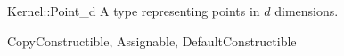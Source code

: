 \begin{ccRefConcept}{Kernel::Point_d}
A type representing points in $d$ dimensions.

\ccRefines
CopyConstructible, Assignable, DefaultConstructible

\ccSeeAlso
{} \\
 \\

\end{ccRefConcept}
